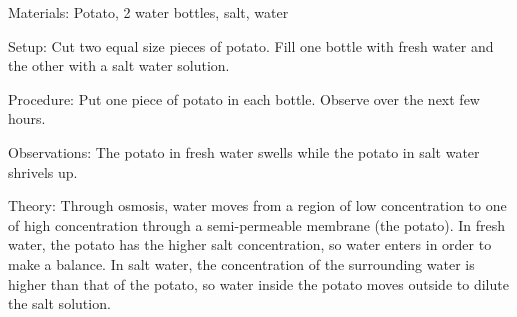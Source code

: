 \begin{multicols}{2}
\begin{description*}
\item[Materials:]{Potato, 2 water bottles, salt, water}
\item[Setup:]{Cut two equal size pieces of potato. Fill one bottle with fresh water and the other with a salt water solution.}
\item[Procedure:]{Put one piece of potato in each bottle. Observe over the next few hours.}
\item[Observations:]{The potato in fresh water swells while the potato in salt water shrivels up.}
\item[Theory:]{Through osmosis, water moves from a region of low concentration to one of high concentration through a semi-permeable membrane (the potato). In fresh water, the potato has the higher salt concentration, so water enters in order to make a balance. In salt water, the concentration of the surrounding water is higher than that of the potato, so water inside the potato moves outside to dilute the salt solution.}
\end{description*}

%
%


\end{multicols}
